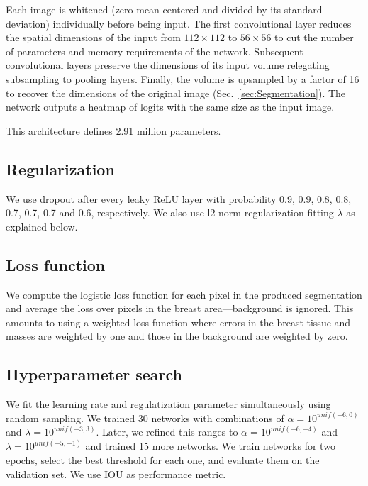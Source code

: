 	Each image is whitened (zero-mean centered and divided by its standard deviation) individually before being input. The first convolutional layer reduces the spatial dimensions of the input from $112 \times 112$ to $56 \times 56$ to cut the number of parameters and memory requirements of the network. Subsequent convolutional layers preserve the dimensions of its input volume relegating subsampling to pooling layers. Finally, the volume is upsampled by a factor of 16 to recover the dimensions of the original image (Sec.~\ref{sec:Segmentation}). The network outputs a heatmap of logits with the same size as the input image.

	This architecture defines 2.91 million parameters. %

\subsection{Regularization}
\label{subsec:Regularization1}
We use dropout after every leaky ReLU layer with probability 0.9, 0.9, 0.8, 0.8, 0.7, 0.7, 0.7 and 0.6, respectively. We also use l2-norm regularization fitting $\lambda$ as explained below.

\subsection{Loss function}
We compute the logistic loss function for each pixel in the produced segmentation and average the loss over pixels in the breast area---background is ignored. This amounts to using a weighted loss function where errors in the breast tissue and masses are weighted by one and those in the background are weighted by zero.

\subsection{Hyperparameter search}
We fit the learning rate and regulatization parameter simultaneously using random sampling. We trained 30 networks with combinations of $\alpha = 10^{unif(-6,0)}$ and $\lambda = 10^{unif(-3,3)}$. Later, we refined this ranges to $\alpha = 10^{unif(-6,-4)}$ and $\lambda = 10^{unif(-5,-1)}$ and trained 15 more networks. We train networks for two epochs, select the best threshold for each one, and evaluate them on the validation set. We use IOU as performance metric.
